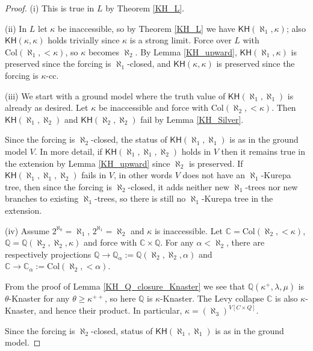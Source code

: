 \documentclass[10pt,reqno]{amsart}
\theoremstyle{plain}
\theoremstyle{definition}
\theoremstyle{remark}
\begin{document}
\begin{proof}
(i) This is true in $L$ by Theorem \ref{KH_L}.

(ii) In $L$ let $\kappa$ be inaccessible, so by Theorem \ref{KH_L} we have $\mathsf{KH}(\aleph_1,\kappa)$; also $\mathsf{KH}(\kappa,\kappa)$ holds trivially since $\kappa$ is a strong limit. Force over $L$ with $\mathrm{Col}(\aleph_1,<\kappa)$, so $\kappa$ becomes $\aleph_2$. By Lemma \ref{KH_upward}, $\mathsf{KH}(\aleph_1,\kappa)$ is preserved since the forcing is $\aleph_1$-closed, and $\mathsf{KH}(\kappa,\kappa)$ is preserved since the forcing is $\kappa$-cc.

(iii) We start with a ground model where the truth value of $\mathsf{KH}(\aleph_1,\aleph_1)$ is already as desired. Let $\kappa$ be inaccessible and force with $\mathrm{Col}(\aleph_2,<\kappa)$. Then $\mathsf{KH}(\aleph_1,\aleph_2)$ and $\mathsf{KH}(\aleph_2,\aleph_2)$ fail by Lemma \ref{KH_Silver}. 

Since the forcing is $\aleph_2$-closed, the status of $\mathsf{KH}(\aleph_1,\aleph_1)$ is as in the ground model $V$. In more detail, if $\mathsf{KH}(\aleph_1,\aleph_1,\aleph_2)$ holds in $V$ then it remains true in the extension by Lemma \ref{KH_upward} since $\aleph_2$ is preserved. If $\mathsf{KH}(\aleph_1,\aleph_1,\aleph_2)$ fails in $V$, in other words $V$ does not have an $\aleph_1$-Kurepa tree, then since the forcing is $\aleph_2$-closed, it adds neither new $\aleph_1$-trees nor new branches to existing $\aleph_1$-trees, so there is still no $\aleph_1$-Kurepa tree in the extension.

(iv) Assume $2^{\aleph_0}=\aleph_1$, $2^{\aleph_1}=\aleph_2$ and $\kappa$ is inaccessible. Let $\mathbb{C}=\mathrm{Col}(\aleph_2,<\kappa)$, $\mathbb{Q}=\mathbb{Q}(\aleph_2,\aleph_2,\kappa)$ and force with $\mathbb{C}\times\mathbb{Q}$. For any $\alpha<\aleph_2$, there are respectively projections $\mathbb{Q}\rightarrow\mathbb{Q}_\alpha:=\mathbb{Q}(\aleph_2,\aleph_2,\alpha)$ and $\mathbb{C}\rightarrow\mathbb{C}_\alpha:=\mathrm{Col}(\aleph_2,<\alpha)$.

From the proof of Lemma \ref{KH_Q_closure_Knaster} we see that $\mathbb{Q}(\kappa^+,\lambda,\mu)$ is $\theta$-Knaster for any $\theta\geq\kappa^{++}$, so here $\mathbb{Q}$ is $\kappa$-Knaster. The Levy collapse $\mathbb{C}$ is also $\kappa$-Knaster, and hence their product. In particular, $\kappa=(\aleph_3)^{V[C\times Q]}$.

Since the forcing is $\aleph_2$-closed, status of $\mathsf{KH}(\aleph_1,\aleph_1)$ is as in the ground model. 


\end{proof}
\end{document}
